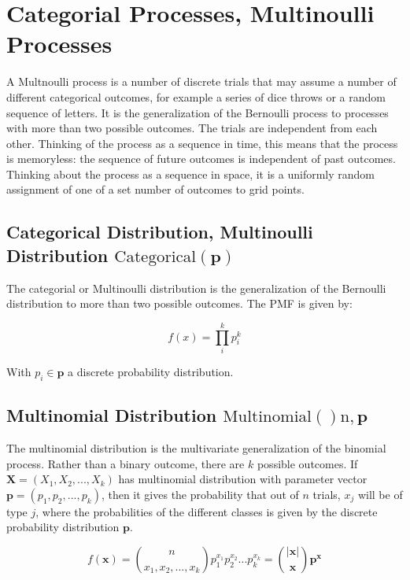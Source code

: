 \section{Categorial Processes, Multinoulli Processes}
A Multnoulli process is a number of discrete trials that may assume a number of different categorical outcomes, for example a series of dice throws or a random sequence of letters. It is the generalization of the Bernoulli process to processes with more than two possible outcomes. The trials are independent from each other. Thinking of the process as a sequence in time, this means that the process is memoryless: the sequence of future outcomes is independent of past outcomes. Thinking about the process as a sequence in space, it is a uniformly random assignment of one of a set number of outcomes to grid points.

\subsection{Categorical Distribution, Multinoulli Distribution $\mathrm{Categorical(\mathbf{p})}$}
The categorial or Multinoulli distribution is the generalization of the Bernoulli distribution to more than two possible outcomes. The PMF is given by:

\begin{equation}
f(x) = \prod_i^k p_i^k
\end{equation}

With $p_i \in \mathbf{p}$ a discrete probability distribution.

\subsection{Multinomial Distribution $\mathrm{Multinomial()n,\mathbf{p}}$}
The multinomial distribution is the multivariate generalization of the binomial process. Rather than a binary outcome, there are $k$ possible outcomes. If $\mathbf{X}=(X_1,X_2,...,X_k)$ has multinomial distribution with parameter vector $\mathbf{p} = (p_1,p_2,...,p_k)$, then it gives the probability that out of $n$ trials, $x_j$ will be of type $j$, where the probabilities of the different classes is given by the discrete probability distribution $\mathbf{p}$.

\begin{equation}
f(\mathbf{x}) = {n \choose x_1,x_2,...,x_k} p_1^{x_1}p_2^{x_2}...p_k^{x_k} = {|\mathbf{x}|\choose \mathbf{x}}\mathbf{p}^{\mathbf{x}}
\end{equation}

